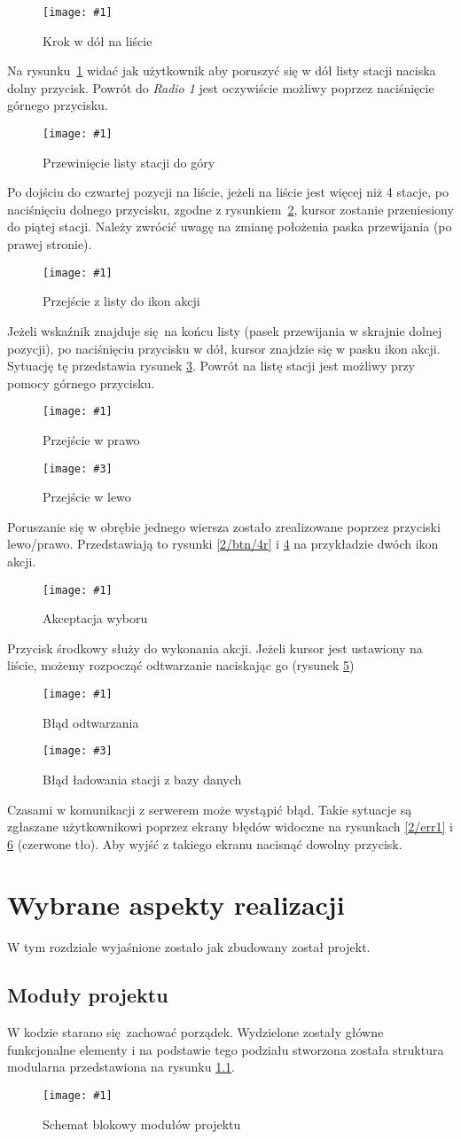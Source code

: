 \documentclass[12pt]{report}
\newcommand{\imgint}[4]{
	\begin{figure}[{#4}]
		\centering
		\texttt{[image: \#1]}
		\caption{#2}
		\label{#1}
	\end{figure}
}
\newcommand{\imgh}[3]{\imgint{#1}{#2}{#3}{H}}
\newcommand{\imgintss}[5]{
	\begin{figure}[{#5}]
		\centering
		\begin{minipage}{.45\textwidth}
			\centering
			\texttt{[image: \#1]}
			\caption{#2}
			\label{#1}
		\end{minipage}%
		\hfill
		\begin{minipage}{.45\textwidth}
			\centering
			\texttt{[image: \#3]}
			\caption{#4}
			\label{#3}
		\end{minipage}
	\end{figure}
}
\newcommand{\imghss}[4]{\imgintss{#1}{#2}{#3}{#4}{H}}
\begin{document}
		\imgh{2/btn/1}{Krok w dół na liście}{0.7}
		Na rysunku~\ref{2/btn/1} widać jak użytkownik aby poruszyć się w dół listy stacji naciska dolny przycisk. Powrót do \textit{Radio 1} jest oczywiście możliwy poprzez naciśnięcie górnego przycisku.
		
		\imgh{2/btn/2}{Przewinięcie listy stacji do góry}{0.7}
		Po dojściu do czwartej pozycji na liście, jeżeli na liście jest więcej niż 4 stacje, po naciśnięciu dolnego przycisku, zgodne z rysunkiem~\ref{2/btn/2}, kursor zostanie przeniesiony do piątej stacji. Należy zwrócić uwagę na zmianę położenia paska przewijania (po prawej stronie).
		
		\imgh{2/btn/3}{Przejście z listy do ikon akcji}{0.7}
		Jeżeli wskaźnik znajduje się na końcu listy (pasek przewijania w skrajnie dolnej pozycji), po naciśnięciu przycisku w dół, kursor znajdzie się w pasku ikon akcji. Sytuację tę przedstawia rysunek \ref{2/btn/3}. Powrót na listę stacji jest możliwy przy pomocy górnego przycisku.
		
		\imghss{2/btn/4r}{Przejście w prawo}{2/btn/4l}{Przejście w lewo}
		Poruszanie się w obrębie jednego wiersza zostało zrealizowane poprzez przyciski \mbox{lewo/prawo}. Przedstawiają to rysunki \ref{2/btn/4r} i \ref{2/btn/4l} na przykładzie dwóch ikon akcji.
		
		\imgh{2/btn/5}{Akceptacja wyboru}{0.7}
		Przycisk środkowy służy do wykonania akcji. Jeżeli kursor jest ustawiony na liście, możemy rozpocząć odtwarzanie naciskając go (rysunek \ref{2/btn/5})
		
		\imghss{2/err1}{Błąd odtwarzania}{2/err2}{Błąd ładowania stacji z bazy danych}
		Czasami w komunikacji z serwerem może wystąpić błąd. Takie sytuacje są zgłaszane użytkownikowi poprzez ekrany błędów widoczne na rysunkach \ref{2/err1} i \ref{2/err2} (czerwone tło). Aby wyjść z takiego ekranu nacisnąć dowolny przycisk.
	
	\chapter{Wybrane aspekty realizacji}
	W tym rozdziale wyjaśnione zostało jak zbudowany został projekt.
	
	\section{Moduły projektu}
	W kodzie starano się zachować porządek. Wydzielone zostały główne funkcjonalne elementy i na podstawie tego podziału stworzona została struktura modularna przedstawiona na rysunku \ref{3/pico-radio-code-block-diagram}.
	\imgh{3/pico-radio-code-block-diagram}{Schemat blokowy modułów projektu}{0.7}
	
\end{document}
